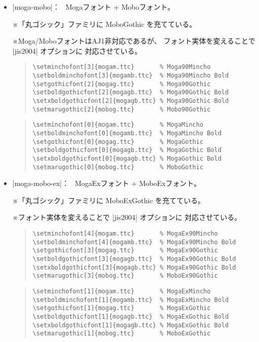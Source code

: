\documentclass[uplatex,dvipdfmx,a4paper]{jsarticle}
\newcommand{\Note}{\par\noindent ※}
\newcommand{\Means}{：\ }
\begin{document}
\begin{itemize}
\item |moga-mobo|\Means
   Mogaフォント + Moboフォント。
   \Note 「丸ゴシック」ファミリに MoboGothic を充てている。
   \Note Moga/MoboフォントはAJ1非対応であるが、
   フォント実体を変えることで |jis2004| オプションに
   対応させている。
   \par\medskip
\begin{quote}\small\begin{verbatim}
\setminchofont[3]{mogam.ttc}       % Moga90Mincho
\setboldminchofont[3]{mogamb.ttc}  % Moga90Mincho Bold
\setgothicfont[2]{mogag.ttc}       % Moga90Gothic
\setboldgothicfont[2]{mogagb.ttc}  % Moga90Gothic Bold
\setxboldgothicfont[2]{mogagb.ttc} % Moga90Gothic Bold
\setmarugothic[2]{mobog.ttc}       % Mobo90Gothic
\end{verbatim}\end{quote}
   \par\medskip
\begin{quote}\small\begin{verbatim}
\setminchofont[0]{mogam.ttc}       % MogaMincho
\setboldminchofont[0]{mogamb.ttc}  % MogaMincho Bold
\setgothicfont[0]{mogag.ttc}       % MogaGothic
\setboldgothicfont[0]{mogagb.ttc}  % MogaGothic Bold
\setxboldgothicfont[0]{mogagb.ttc} % MogaGothic Bold
\setmarugothic[0]{mobog.ttc}       % MoboGothic
\end{verbatim}\end{quote}

\item |moga-mobo-ex|\Means
   MogaExフォント + MoboExフォント。
   \Note 「丸ゴシック」ファミリに MoboExGothic を充てている。
   \Note フォント実体を変えることで |jis2004| オプションに
   対応させている。
   \par\medskip
\begin{quote}\small\begin{verbatim}
\setminchofont[4]{mogam.ttc}       % MogaEx90Mincho
\setboldminchofont[4]{mogamb.ttc}  % MogaEx90Mincho Bold
\setgothicfont[3]{mogag.ttc}       % MogaEx90Gothic
\setboldgothicfont[3]{mogagb.ttc}  % MogaEx90Gothic Bold
\setxboldgothicfont[3]{mogagb.ttc} % MogaEx90Gothic Bold
\setmarugothic[3]{mobog.ttc}       % MoboEx90Gothic
\end{verbatim}\end{quote}
   \par\medskip
\begin{quote}\small\begin{verbatim}
\setminchofont[1]{mogam.ttc}       % MogaExMincho
\setboldminchofont[1]{mogamb.ttc}  % MogaExMincho Bold
\setgothicfont[1]{mogag.ttc}       % MogaExGothic
\setboldgothicfont[1]{mogagb.ttc}  % MogaExGothic Bold
\setxboldgothicfont[1]{mogagb.ttc} % MogaExGothic Bold
\setmarugothic[1]{mobog.ttc}       % MoboExGothic
\end{verbatim}\end{quote}


\end{itemize}
\end{document}
